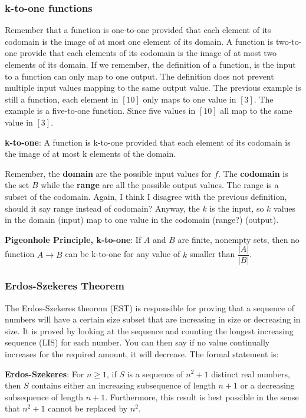 \documentclass{article}
\begin{document}
\subsubsection{k-to-one functions}
Remember that a function is one-to-one provided that each element of its codomain is the image of at most one element of its domain. A function is two-to-one provide that each elements of its codomain is the image of at most two elements of its domain. If we remember, the definition of a function, is the input to a function can only map to one output. The definition does not prevent multiple input values mapping to the same output value. The previous example is still a function, each element in $[10]$ only maps to one value in $[3]$. The example is a five-to-one function. Since five values in $[10]$ all map to the same value in $[3]$.
\medskip

\textbf{k-to-one}: A function is k-to-one provided that each element of its codomain is the image of at most k elements of the domain.
\medskip

Remember, the \textbf{domain} are the possible input values for $f$. The \textbf{codomain} is the set $B$ while the \textbf{range} are all the possible output values. The range is a subset of the codomain. Again, I think I disagree with the previous definition, should it say range instead of codomain? Anyway, the $k$ is the input, so $k$ values in the domain (input) map to one value in the codomain (range?) (output).

\begin{thm}
\textbf{Pigeonhole Principle, k-to-one}: If $A$ and $B$ are finite, nonempty sets, then no function $A \rightarrow B$ can be k-to-one for any value of $k$ smaller than $\dfrac{|A|}{|B|}$.
\end{thm}

\subsubsection{Erdos-Szekeres Theorem}

The Erdos-Szekeres theorem (EST) is responsible for proving that a sequence of numbers will have a certain size subset that are increasing in size or decreasing in size. It is proved by looking at the sequence and counting the longest increasing sequence (LIS) for each number. You can then say if no value continually increases for the required amount, it will decrease. The formal statement is:

\begin{thm}
\textbf{Erdos-Szekeres}: For $n \geq 1$, if $S$ is a sequence of $n^{2}+1$ distinct real numbers, then $S$ contains either an increasing subsequence of length $n+1$ or a decreasing subsequence of length $n+1$. Furthermore, this result is best possible in the sense that $n^2+1$ cannot be replaced by $n^2$.
\end{thm}
\end{document}
